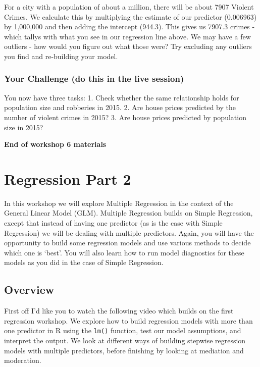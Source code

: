 \documentclass[
]{book}
\begin{document}
For a city with a population of about a million, there will be about 7907 Violent Crimes. We calculate this by multiplying the estimate of our predictor (0.006963) by 1,000,000 and then adding the intercept (944.3). This gives us 7907.3 crimes - which tallys with what you see in our regression line above. We may have a few outliers - how would you figure out what those were? Try excluding any outliers you find and re-building your model.

\hypertarget{your-challenge-do-this-in-the-live-session-2}{%
\subsection{Your Challenge (do this in the live session)}\label{your-challenge-do-this-in-the-live-session-2}}

You now have three tasks:
1. Check whether the same relationship holds for population size and robberies in 2015.
2. Are house prices predicted by the number of violent crimes in 2015?
3. Are house prices predicted by population size in 2015?

\textbf{End of workshop 6 materials}

\hypertarget{regression-part-2}{%
\chapter{Regression Part 2}\label{regression-part-2}}

In this workshop we will explore Multiple Regression in the context of the General Linear Model (GLM). Multiple Regression builds on Simple Regression, except that instead of having one predictor (as is the case with Simple Regression) we will be dealing with multiple predictors. Again, you will have the opportunity to build some regression models and use various methods to decide which one is `best'. You will also learn how to run model diagnostics for these models as you did in the case of Simple Regression.

\hypertarget{overview-2}{%
\section{Overview}\label{overview-2}}

First off I'd like you to watch the following video which builds on the first regression workshop. We explore how to build regression models with more than one predictor in R using the \texttt{lm()} function, test our model assumptions, and interpret the output. We look at different ways of building stepwise regression models with multiple predictors, before finishing by looking at mediation and moderation.
\end{document}
